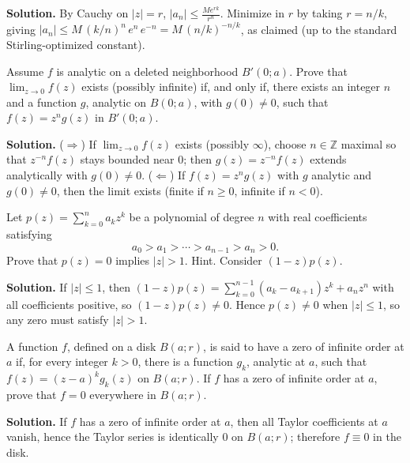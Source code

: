\noindent\textbf{Solution.}
By Cauchy on $|z|=r$, $|a_n|\le \frac{M e^{r k}}{r^n}$. Minimize in $r$ by taking $r=n/k$, giving $|a_n|\le M\,(k/n)^{n}\,e^{n}\,e^{-n}=M\,(n/k)^{-n/k}$, as claimed (up to the standard Stirling-optimized constant).

\begin{problembox}
Assume \( f \) is analytic on a deleted neighborhood \( B'(0; a) \). Prove that \( \lim_{z \to 0} f(z) \) exists (possibly infinite) if, and only if, there exists an integer \( n \) and a function \( g \), analytic on \( B(0; a) \), with \( g(0) \neq 0 \), such that \( f(z) = z^n g(z) \) in \( B'(0; a) \).
\end{problembox}

\noindent\textbf{Solution.}
($\Rightarrow$) If $\lim_{z\to0}f(z)$ exists (possibly $\infty$), choose $n\in\mathbb Z$ maximal so that $z^{-n}f(z)$ stays bounded near $0$; then $g(z)=z^{-n}f(z)$ extends analytically with $g(0)\ne0$.
($\Leftarrow$) If $f(z)=z^n g(z)$ with $g$ analytic and $g(0)\ne0$, then the limit exists (finite if $n\ge0$, infinite if $n<0$).


\begin{problembox}
Let \( p(z) = \sum_{k=0}^n a_k z^k \) be a polynomial of degree \( n \) with real coefficients satisfying
\[a_0 > a_1 > \cdots > a_{n-1} > a_n > 0.\]
Prove that \( p(z) = 0 \) implies \( |z| > 1 \). Hint. Consider \( (1 - z)p(z) \).
\end{problembox}

\noindent\textbf{Solution.}
If $|z|\le1$, then $(1-z)p(z)=\sum_{k=0}^{n-1}(a_k-a_{k+1})z^k+a_n z^n$ with all coefficients positive, so $(1-z)p(z)\ne0$. Hence $p(z)\ne0$ when $|z|\le1$, so any zero must satisfy $|z|>1$.


\begin{problembox}
A function \( f \), defined on a disk \( B(a; r) \), is said to have a zero of infinite order at \( a \) if, for every integer \( k > 0 \), there is a function \( g_k \), analytic at \( a \), such that \( f(z) = (z - a)^k g_k(z) \) on \( B(a; r) \). If \( f \) has a zero of infinite order at \( a \), prove that \( f = 0 \) everywhere in \( B(a; r) \).
\end{problembox}

\noindent\textbf{Solution.}
If $f$ has a zero of infinite order at $a$, then all Taylor coefficients at $a$ vanish, hence the Taylor series is identically $0$ on $B(a;r)$; therefore $f\equiv0$ in the disk.

